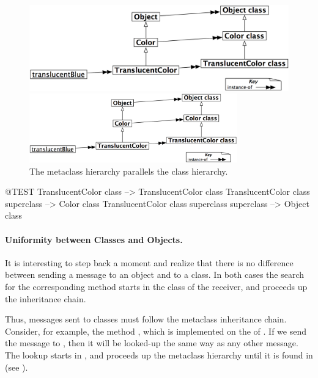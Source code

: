 \documentclass[a4paper,10pt,twoside]{book}
\begin{document}
\begin{center}
\begin{figure}[!ht]
\ifluluelse
	{\centerline {\includegraphics[width=\textwidth]{TranslucentMetaclassHierarchy}}}
	{\centerline {\includegraphics[width=0.8\textwidth]{TranslucentMetaclassHierarchy}}}
\caption{The metaclass hierarchy parallels the class hierarchy.\label{fig:parallelHierarchies}}
\end{figure}
\end{center}

\begin{code}{@TEST}
TranslucentColor class                                     --> TranslucentColor class
TranslucentColor class superclass                   --> Color class
TranslucentColor class superclass superclass --> Object class
\end{code}

\paragraph{Uniformity between Classes and Objects.}
It is interesting to step back a moment and realize that there is no difference between sending a message to an object and to a class. 
In both cases the search for the corresponding method starts in the class of the receiver, and proceeds up the inheritance chain.

Thus, messages sent to classes must follow the metaclass inheritance chain.
Consider, for example, the method , which is implemented on the  of .
If we send the message  to , then it will be looked-up the same way as any other message.
The lookup starts in , and proceeds up the metaclass hierarchy until it is found in  (see ).
\end{document}

